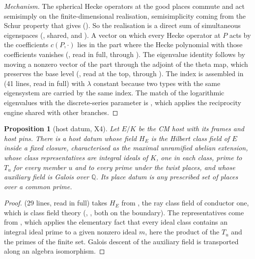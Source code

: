 \documentclass[11pt]{article}
\newtheorem{proposition}[theorem]{Proposition}
\theoremstyle{remark}
\begin{document}
\begin{proof}[Mechanism]
The spherical Hecke operators at the good places commute and act semisimply on the finite-dimensional realisation, semisimplicity coming from the Schur property that  gives (). So the realisation is a direct sum of simultaneous eigenspaces (, shared, and ). A vector on which every Hecke operator at $P$ acts by the coefficients $c(P,\cdot)$ lies in the part where the Hecke polynomial  with those coefficients vanishes (, read in full, through ). The eigenvalue identity follows by moving a nonzero vector of the part through the adjoint of the theta map, which preserves the base level (, read at the top, through ). The index is assembled in  (41 lines, read in full) with $\lambda$ constant because two types with the same eigensystem are carried by the same index. The match of the logarithmic eigenvalues with the discrete-series parameter is , which applies the reciprocity engine shared with other branches.
\end{proof}

\begin{proposition}[host datum, X4]\label{prop:host}
Let $E/K$ be the CM host with its frames and host pins. There is a host datum whose field $H_E$ is the Hilbert class field of $E$ inside a fixed closure, characterised as the maximal unramified abelian extension, whose class representatives are integral ideals of $K$, one in each class, prime to $T_u$ for every member $u$ and to every prime under the twist places, and whose auxiliary field is Galois over $\mathbb Q$. Its place datum is any prescribed set of places over a common prime.
\end{proposition}

\begin{proof}
 (29 lines, read in full) takes $H_E$ from , the ray class field of conductor one, which is class field theory (, , both on the boundary). The representatives come from , which applies the elementary fact that every ideal class contains an integral ideal prime to a given nonzero ideal $m$, here the product of the $T_u$ and the primes of the finite set. Galois descent of the auxiliary field is transported along an algebra isomorphism.
\end{proof}
\end{document}
